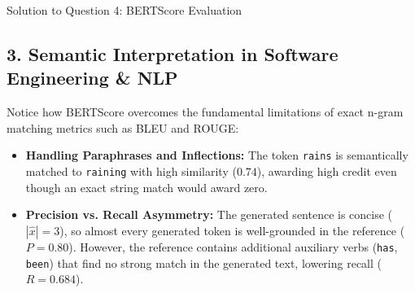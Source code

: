 \documentclass[11pt,a4paper]{article}
\begin{document}
\begin{solutionbox}{Solution to Question 4: BERTScore Evaluation}
\subsection*{3. Semantic Interpretation in Software Engineering \& NLP}
Notice how BERTScore overcomes the fundamental limitations of exact n-gram matching metrics such as BLEU and ROUGE:
\begin{itemize}[leftmargin=1.5em,itemsep=1pt]
    \item \textbf{Handling Paraphrases and Inflections:} The token \texttt{rains} is semantically matched to \texttt{raining} with high similarity ($0.74$), awarding high credit even though an exact string match would award zero.
    \item \textbf{Precision vs. Recall Asymmetry:} The generated sentence is concise ($|\hat{x}| = 3$), so almost every generated token is well-grounded in the reference ($P = 0.80$). However, the reference contains additional auxiliary verbs (\texttt{has}, \texttt{been}) that find no strong match in the generated text, lowering recall ($R = 0.684$).
\end{itemize}
\end{solutionbox}

\vspace{0.4cm}
\end{document}
